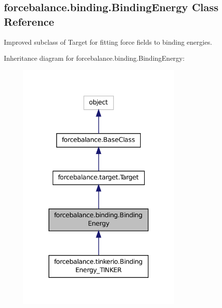 \hypertarget{classforcebalance_1_1binding_1_1BindingEnergy}{\subsection{forcebalance.\-binding.\-Binding\-Energy Class Reference}
\label{classforcebalance_1_1binding_1_1BindingEnergy}
}


Improved subclass of Target for fitting force fields to binding energies.  




Inheritance diagram for forcebalance.\-binding.\-Binding\-Energy\-:
\nopagebreak
\begin{figure}[H]
\begin{center}
\leavevmode
\includegraphics[width=234pt]{classforcebalance_1_1binding_1_1BindingEnergy__inherit__graph}
\end{center}
\end{figure}


